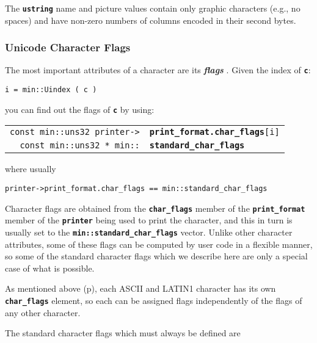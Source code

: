 \documentclass[12pt]{article}
\makeatletter
\newcommand{\TT}[1]{{\tt \bfseries #1}}
\newcommand{\smkey}[3]{{\bf \em #1#2}\index{#1!#3}}
\newcommand{\ttindex}[1]{\index{#1@{\tt #1}}}
\newcommand{\pagref}[1]{p\pageref{#1}}
\newcommand{\EOL}{\penalty \exhyphenpenalty}
\newenvironment{indpar}[1][0.3in]%
	{\begin{list}{}%
		     {\setlength{\itemsep}{0in}%
		      \setlength{\topsep}{0in}%
		      \setlength{\parsep}{1ex}%
		      \setlength{\labelwidth}{#1}%
		      \setlength{\leftmargin}{#1}%
		      \addtolength{\leftmargin}{\labelsep}}%
	 \item}%
	{\end{list}}
\newcommand{\LABEL}[1]{\label{#1}}
\newcommand{\MINKEY}[1]%
	   {\TT{#1}\ttindex{min::#1}\ttindex{#1}}
\makeatother
\begin{document}
The \TT{ustring} name and picture values contain only graphic
characters (e.g., no spaces) and have non-zero numbers of columns
encoded in their second bytes.

\subsubsection{Unicode Character Flags}
\label{UNICODE-CHARACTER-FLAGS}

The most important attributes of a character are its
\smkey{flag}s{of UNICODE character}%
\label{CHARACTER-FLAGS}.
Given the index of \TT{c}:

\begin{center}
\tt i = min::Uindex ( c )
\end{center}

you can find out the flags of \TT{c} by using:

\begin{indpar}\begin{tabular}{r@{}l}
\verb|const min::uns32 printer->|
    & \MINKEY{print\_format.char\_flags}\verb|[i]|
\LABEL{MIN::PRINT_FORMAT.CHAR_FLAGS} \\
\verb|const min::uns32 * min::|
    & \MINKEY{standard\_char\_flags}
\LABEL{MIN::STANDARD_CHAR_FLAGS} \\
\end{tabular}\end{indpar}

where usually

\begin{center}
\tt printer->print\_format.char\_flags == min::standard\_char\_flags
\end{center}

Character flags are obtained from
the \TT{char\_\EOL flags} member of the \TT{print\_\EOL format} member of
the \TT{printer} being used to print the character, and this
in turn is usually set to the \TT{min::\EOL standard\_\EOL char\_\EOL flags}
vector.  Unlike other character attributes, some of these flags can be computed
by user code in a flexible manner, so some of the standard character
flags which we describe here are only a special case of what is
possible.

As mentioned above (\pagref{ASCII-LATIN1-UNIQUE-INDEX}), each ASCII
and LATIN1 character has its own \TT{char\_\EOL flags} element, so each
can be assigned flags independently of the flags of any other character.

The standard character flags which must always be defined are
\end{document}
